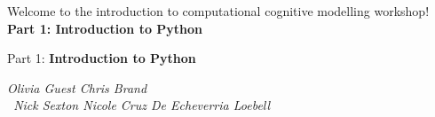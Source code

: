 \documentclass[handout]{beamer}
\begin{document}
\begin{frame}
% 
\centering\Huge Welcome to the introduction to computational cognitive modelling workshop! 
\vfill \huge
\centering\textbf{Part 1: Introduction to Python} \normalsize

\vfill
\end{frame}

\begin{frame}
% 
\vfill \Huge
\centering Part 1: \textbf{Introduction to Python} \large

\vfill
\textit{
Olivia Guest \hfill  Chris Brand 
\vspace{0.5cm} \\ \ 
Nick Sexton \hfill Nicole Cruz De Echeverria Loebell } 
\end{frame}
\end{document}
